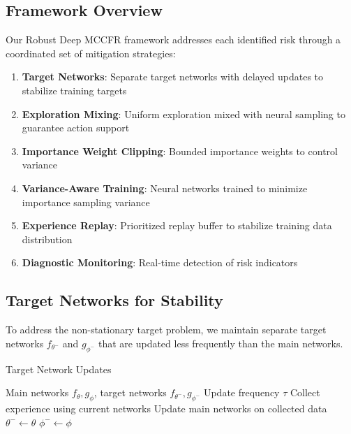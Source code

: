 \documentclass[12pt,a4paper]{article}
\begin{document}
\subsection{Framework Overview}

Our Robust Deep MCCFR framework addresses each identified risk through a coordinated set of mitigation strategies:

\begin{enumerate}
\item \textbf{Target Networks}: Separate target networks with delayed updates to stabilize training targets
\item \textbf{Exploration Mixing}: Uniform exploration mixed with neural sampling to guarantee action support
\item \textbf{Importance Weight Clipping}: Bounded importance weights to control variance
\item \textbf{Variance-Aware Training}: Neural networks trained to minimize importance sampling variance
\item \textbf{Experience Replay}: Prioritized replay buffer to stabilize training data distribution
\item \textbf{Diagnostic Monitoring}: Real-time detection of risk indicators
\end{enumerate}

\subsection{Target Networks for Stability}

To address the non-stationary target problem, we maintain separate target networks $f_{\theta^-}$ and $g_{\phi^-}$ that are updated less frequently than the main networks.

\begin{algorithm}[H]
\caption{Target Network Updates}
\begin{algorithmic}
\REQUIRE Main networks $f_\theta, g_\phi$, target networks $f_{\theta^-}, g_{\phi^-}$
\REQUIRE Update frequency $\tau$
    \STATE Collect experience using current networks
    \STATE Update main networks on collected data
        \STATE $\theta^- \leftarrow \theta$
        \STATE $\phi^- \leftarrow \phi$
    \ENDIF
\ENDFOR
\end{algorithmic}
\end{algorithm}
\end{document}

